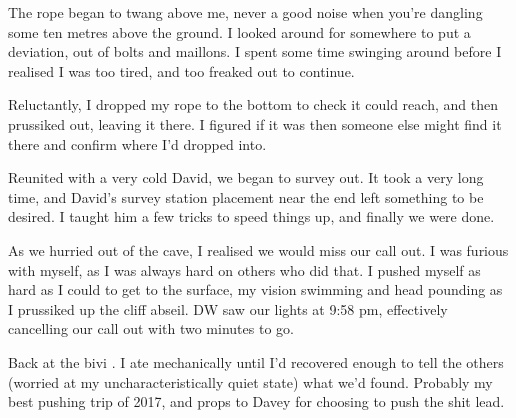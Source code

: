 The rope began to twang above me, never a good noise when you’re dangling some ten metres above the ground. I looked around for somewhere to put a deviation, out of bolts and maillons. I spent some time swinging around before I realised I was too tired, and too freaked out to continue. 

Reluctantly, I dropped my rope to the bottom to check it could reach, and then prussiked out, leaving it there. I figured if it was  then someone else might find it there and confirm where I’d dropped into.

Reunited with a very cold David, we began to survey out. It took a very long time, and David’s survey station placement near the end left something to be desired. I taught him a few tricks to speed things up, and finally we were done.

As we hurried out of the cave, I realised we would miss our call out. I was furious with myself, as I was always hard on others who did that. I pushed myself as hard as I could to get to the surface, my vision swimming and head pounding as I prussiked up the cliff abseil. DW saw our lights at 9:58 pm, effectively cancelling our call out with two minutes to go.

Back at the bivi . I ate mechanically until I’d recovered enough to tell the others (worried at my uncharacteristically quiet state) what we’d found. Probably my best pushing trip of 2017, and props to Davey for choosing to push the shit lead.

